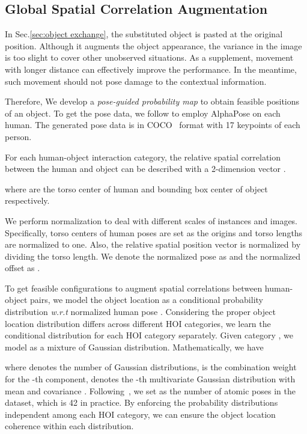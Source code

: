 \documentclass[10pt,twocolumn,letterpaper]{article}
\begin{document}
\subsection{Global Spatial Correlation Augmentation}
\label{sec:pose-guided}
In Sec.\ref{sec:object exchange}, the substituted object is pasted at the original position. Although it augments the object appearance, the variance in the image is too slight to cover other unobserved situations. As a supplement, movement with longer distance can effectively improve the performance. In the meantime, such movement should not pose damage to the contextual information.

Therefore, We develop a \textit{pose-guided probability map} to obtain feasible positions of an object. To get the pose data, we follow \cite{li2019transferable} to employ AlphaPose \cite{fang2017rmpe,li2019crowdpose} on each human. The generated pose data  is in COCO~\cite{lin2014microsoft} format with 17 keypoints of each person.

For each human-object interaction category, the relative spatial correlation between the human and object can be described with a 2-dimension vector .


where  are the torso center of human and bounding box center of object respectively.

We perform normalization to deal with different scales of instances and images. Specifically, torso centers of human poses are set as the origins and torso lengths are normalized to one. Also, the relative spatial position vector  is normalized by dividing the torso length. We denote the normalized pose as  and the normalized offset as .

To get feasible configurations to augment spatial correlations between human-object pairs, we model the object location  as a conditional probability distribution \textit{w.r.t} normalized human pose . Considering the proper object location distribution differs across different HOI categories, we learn the conditional distribution for each HOI category separately. Given category , we model  as a mixture of Gaussian distribution. Mathematically, we have

where  denotes the number of Gaussian distributions,  is the combination weight for the -th component,  denotes the -th multivariate Gaussian distribution with mean  and covariance . Following~\cite{andriluka20142d, fang2018learning}, we set  as the number of atomic poses in the dataset, which is 42 in practice. By enforcing the probability distributions independent among each HOI category, we can ensure the object location coherence within each distribution.
\end{document}
